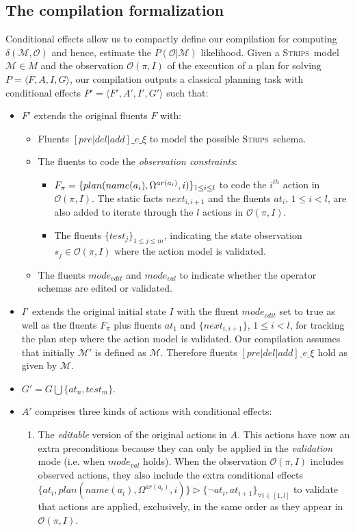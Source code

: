 \documentclass[letterpaper]{article} %
\newcommand{\tup}[1]{{\langle #1 \rangle}}
\newcommand{\strips}{\textsc{Strips}}     %
\begin{document}
\subsection{The compilation formalization}
Conditional effects allow us to compactly define our compilation for computing $\delta(\mathcal{M},\mathcal{O})$ and hence, estimate the $P(\mathcal{O}|\mathcal{M})$ likelihood. Given a \strips\ model $\mathcal{M}\in M$ and the observation $\mathcal{O}(\pi,I)$ of the execution of a plan for solving $P=\tup{F,A,I,G}$, our compilation outputs a classical planning task with conditional effects $P'=\tup{F',A',I',G'}$ such that:
\begin{itemize}
\item $F'$ extends the original fluents $F$ with:
\begin{itemize}
\item Fluents $[pre|del|add]\_e\_\xi$ to model the possible \strips\ schema. 
\item The fluents to code the {\em observation constraints}:
\begin{itemize}
\item $F_{\pi}=\{plan(name(a_i),\Omega^{ar(a_i)},i)\}_{\small 1\leq i\leq l}$ to code the $i^{th}$ action in $\mathcal{O}(\pi,I)$. The static facts $next_{i,i+1}$ and the fluents $at_i$, {\small $1\leq i< l$}, are also added to iterate through the $l$ actions in $\mathcal{O}(\pi,I)$.
\item The fluents $\{test_j\}_{1\leq j\leq m}$, indicating the state observation $s_j\in\mathcal{O}(\pi,I)$ where the action model is validated.
\end{itemize}
\item The fluents $mode_{edit}$ and $mode_{val}$ to indicate whether the operator schemas are edited or validated.
\end{itemize}
\item $I'$ extends the original initial state $I$ with the fluent $mode_{edit}$ set to true as well as the fluents $F_{\pi}$ plus fluents $at_1$ and $\{next_{i,i+1}\}$, {\small $1\leq i<l$}, for tracking the plan step where the action model is validated. Our compilation assumes that initially $\mathcal{M}'$ is defined as $\mathcal{M}$. Therefore fluents $[pre|del|add]\_e\_\xi$ hold as given by $\mathcal{M}$.

\item $G'=G\bigcup\{at_n,test_m\}$.
\item $A'$ comprises three kinds of actions with conditional effects:
\begin{enumerate}
\item The {\em editable} version of the original actions in $A$. This actions have now an extra preconditions because they can only be applied in the {\em validation} mode (i.e. when $mode_{val}$ holds). When the observation $\mathcal{O}(\pi,I)$ includes observed actions, they also include the extra conditional effects $\{at_{i},plan(name(a_i),\Omega^{ar(a_i)},i)\}\rhd\{\neg at_{i},at_{i+1}\}_{\forall i\in [1,l]}$ to validate that actions are applied, exclusively, in the same order as they appear in $\mathcal{O}(\pi,I)$.\\


\end{enumerate}
\end{itemize}
\end{document}
